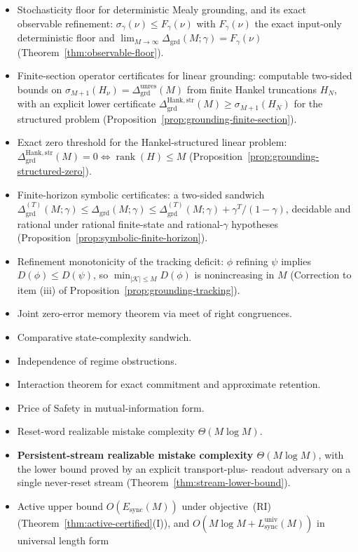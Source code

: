 \documentclass[12pt]{article}
\theoremstyle{definition}
\DeclareMathOperator{\rank}{rank}
\newcommand{\Dunres}{\Delta_{\mathrm{grd}}^{\mathrm{unres}}}
\newcommand{\DHankstr}{\Delta_{\mathrm{grd}}^{\mathrm{Hank,str}}}
\newcommand{\Lsyncu}{L_{\mathrm{sync}}^{\mathrm{univ}}}
\newcommand{\Esync}{E_{\mathrm{sync}}}
\begin{document}
\begin{itemize}[leftmargin=1.6em]
\item Stochasticity floor for deterministic Mealy grounding, and its exact
observable refinement: $\sigma_\gamma(\nu)\le F_\gamma(\nu)$ with
$F_\gamma(\nu)$ the exact input-only deterministic floor and
$\lim_{M\to\infty}\Delta_{\mathrm{grd}}(M;\gamma)=F_\gamma(\nu)$
(Theorem~\ref{thm:observable-floor}).
\item Finite-section operator certificates for linear grounding: computable
two-sided bounds on $\sigma_{M+1}(H_\nu)=\Dunres(M)$ from finite Hankel
truncations $H_N$, with an explicit lower certificate
$\DHankstr(M)\ge\sigma_{M+1}(H_N)$ for the structured problem
(Proposition~\ref{prop:grounding-finite-section}).
\item Exact zero threshold for the Hankel-structured linear problem:
$\DHankstr(M)=0\iff\rank(H)\le M$
(Proposition~\ref{prop:grounding-structured-zero}).
\item Finite-horizon symbolic certificates: a two-sided sandwich
$\Delta^{(T)}_{\mathrm{grd}}(M;\gamma)\le\Delta_{\mathrm{grd}}(M;\gamma)\le
\Delta^{(T)}_{\mathrm{grd}}(M;\gamma)+\gamma^T/(1-\gamma)$, decidable and
rational under rational finite-state and rational-$\gamma$ hypotheses
(Proposition~\ref{prop:symbolic-finite-horizon}).
\item Refinement monotonicity of the tracking deficit: $\phi$ refining $\psi$
implies $D(\phi)\le D(\psi)$, so $\min_{|\mathcal K|\le M}D(\phi)$ is
nonincreasing in $M$ (Correction to item (iii) of
Proposition~\ref{prop:grounding-tracking}).
\item Joint zero-error memory theorem via meet of right congruences.
\item Comparative state-complexity sandwich.
\item Independence of regime obstructions.
\item Interaction theorem for exact commitment and approximate retention.
\item Price of Safety in mutual-information form.
\item Reset-word realizable mistake complexity $\Theta(M\log M)$.
\item \textbf{Persistent-stream realizable mistake complexity
$\Theta(M\log M)$}, with the lower bound proved by an explicit transport-plus-
readout adversary on a single never-reset stream
(Theorem~\ref{thm:stream-lower-bound}).
\item Active upper bound $O(\Esync(M))$ under objective~(RI)
(Theorem~\ref{thm:active-certified}(I)), and
$O(M\log M+\Lsyncu(M))$ in universal length form

\end{itemize}
\end{document}
